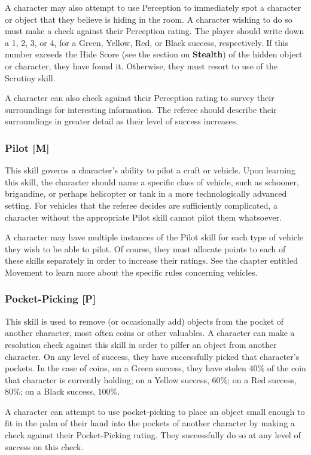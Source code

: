 \documentclass[oneside]{book}
\begin{document}
\begin{multicols}{2}
A character may also attempt to use Perception to immediately spot a character or object that they believe is hiding in the room. A character wishing to do so must make a check against their Perception rating. The player should write down a 1, 2, 3, or 4, for a Green, Yellow, Red, or Black success, respectively. If this number exceeds the Hide Score (see the section on \textbf{Stealth}) of the hidden object or character, they have found it. Otherwise, they must resort to use of the Scrutiny skill.

A character can also check against their Perception rating to survey their surroundings for interesting information. The referee should describe their surroundings in greater detail as their level of success increases. 


\subsubsection{Pilot [M]}
This skill governs a character's ability to pilot a craft or vehicle. Upon learning this skill, the character should name a specific class of vehicle, such as schooner, brigandine, or perhaps helicopter or tank in a more technologically advanced setting. For vehicles that the referee decides are sufficiently complicated, a character without the appropriate Pilot skill cannot pilot them whatsoever.

A character may have multiple instances of the Pilot skill for each type of vehicle they wish to be able to pilot. Of course, they must allocate points to each of these skills separately in order to increase their ratings.
See the chapter entitled Movement to learn more about the specific rules concerning vehicles. 

\subsubsection{Pocket-Picking [P]}
This skill is used to remove (or occasionally add) objects from the pocket of another character, most often coins or other valuables. A character can make a resolution check against this skill in order to pilfer an object from another character. On any level of success, they have successfully picked that character's pockets. In the case of coins, on a Green success, they have stolen 40\% of the coin that character is currently holding; on a Yellow success, 60\%; on a Red success, 80\%; on a Black success, 100\%.

A character can attempt to use pocket-picking to place an object small enough to fit in the palm of their hand into the pockets of another character by making a check against their Pocket-Picking rating. They successfully do so at any level of success on this check.


\end{multicols}
\end{document}
